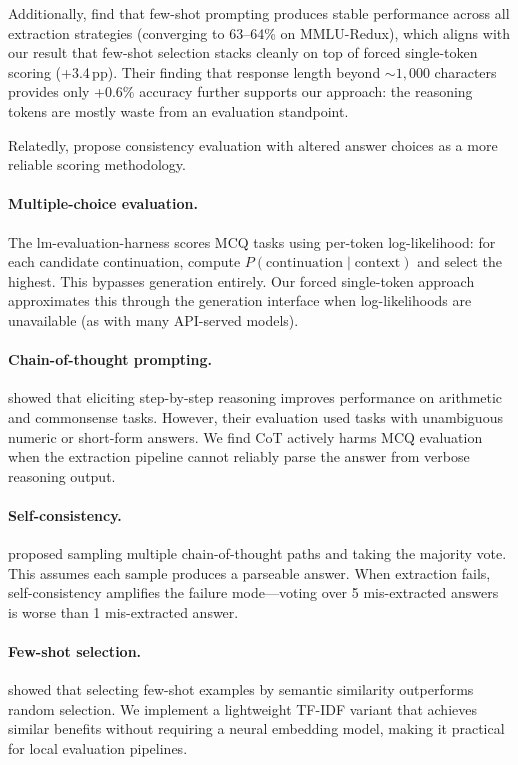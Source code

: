\documentclass[11pt]{article}
\begin{document}
Additionally, \citeauthor{molfese2025} find that few-shot prompting produces stable performance across all extraction strategies (converging to 63--64\% on MMLU-Redux), which aligns with our result that few-shot selection stacks cleanly on top of forced single-token scoring (+3.4\,pp). Their finding that response length beyond ${\sim}1{,}000$ characters provides only +0.6\% accuracy further supports our approach: the reasoning tokens are mostly waste from an evaluation standpoint.

Relatedly, \citet{molfese2025b} propose consistency evaluation with altered answer choices as a more reliable scoring methodology.

\paragraph{Multiple-choice evaluation.}
The lm-evaluation-harness \citep{gao2023harness} scores MCQ tasks using per-token log-likelihood: for each candidate continuation, compute $P(\text{continuation} \mid \text{context})$ and select the highest. This bypasses generation entirely. Our forced single-token approach approximates this through the generation interface when log-likelihoods are unavailable (as with many API-served models).

\paragraph{Chain-of-thought prompting.}
\citet{wei2022} showed that eliciting step-by-step reasoning improves performance on arithmetic and commonsense tasks. However, their evaluation used tasks with unambiguous numeric or short-form answers. We find CoT actively harms MCQ evaluation when the extraction pipeline cannot reliably parse the answer from verbose reasoning output.

\paragraph{Self-consistency.}
\citet{wang2023} proposed sampling multiple chain-of-thought paths and taking the majority vote. This assumes each sample produces a parseable answer. When extraction fails, self-consistency amplifies the failure mode---voting over 5 mis-extracted answers is worse than 1 mis-extracted answer.

\paragraph{Few-shot selection.}
\citet{liu2022} showed that selecting few-shot examples by semantic similarity outperforms random selection. We implement a lightweight TF-IDF variant that achieves similar benefits without requiring a neural embedding model, making it practical for local evaluation pipelines.
\end{document}
